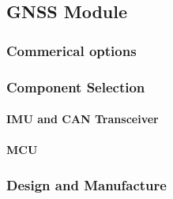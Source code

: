 \subsection{GNSS Module}

\subsubsection{Commerical options}

\subsubsection{Component Selection}
\paragraph{\gls{IMU} and \gls{CAN} Transceiver}
\paragraph{\gls{MCU}}

\subsubsection{Design and Manufacture}

